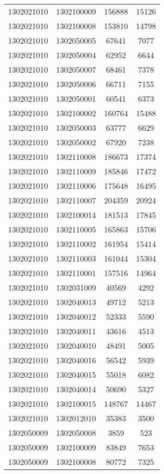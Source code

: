 \begin{longtable}{llcc}
1302021010 & 1302100009 & 156888 & 15126\\
1302021010 & 1302100008 & 153810 & 14798\\
1302021010 & 1302050005 & 67641 & 7077\\
1302021010 & 1302050004 & 62952 & 6644\\
1302021010 & 1302050007 & 68461 & 7378\\
1302021010 & 1302050006 & 66711 & 7155\\
1302021010 & 1302050001 & 60541 & 6373\\
1302021010 & 1302100002 & 160764 & 15488\\
1302021010 & 1302050003 & 63777 & 6629\\
1302021010 & 1302050002 & 67920 & 7238\\
1302021010 & 1302110008 & 186673 & 17374\\
1302021010 & 1302110009 & 185846 & 17472\\
1302021010 & 1302110006 & 175648 & 16495\\
1302021010 & 1302110007 & 204359 & 20924\\
1302021010 & 1302100014 & 181513 & 17845\\
1302021010 & 1302110005 & 165863 & 15706\\
1302021010 & 1302110002 & 161954 & 15414\\
1302021010 & 1302110003 & 161044 & 15304\\
1302021010 & 1302110001 & 157516 & 14964\\
1302021010 & 1302031009 & 40569 & 4292\\
1302021010 & 1302040013 & 49712 & 5213\\
1302021010 & 1302040012 & 52333 & 5590\\
1302021010 & 1302040011 & 43616 & 4513\\
1302021010 & 1302040010 & 48491 & 5005\\
1302021010 & 1302040016 & 56542 & 5939\\
1302021010 & 1302040015 & 55018 & 6082\\
1302021010 & 1302040014 & 50690 & 5327\\
1302021010 & 1302100015 & 148767 & 14467\\
1302021010 & 1302012010 & 35383 & 3500\\
1302050009 & 1302050008 & 3859 & 523\\
1302050009 & 1302100009 & 83849 & 7653\\
1302050009 & 1302100008 & 80772 & 7325\\

\end{longtable}
